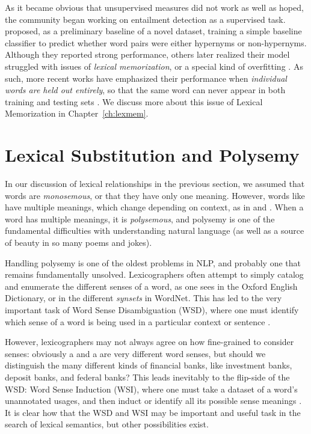 As it became obvious that unsupervised measures did not work as
well as hoped, the community began working on entailment detection as a
supervised task.  proposed, as a preliminary baseline
of a novel dataset, training a simple baseline classifier to predict whether
word pairs were either hypernyms or non-hypernyms. Although they reported strong performance,
others later realized their model struggled with issues of {\em lexical
memorization}, or a special kind of overfitting
\cite{roller:2014:coling,weeds:2014:coling,levy:2015:naacl}. As such, more
recent works have emphasized their performance when {\em individual words are
held out entirely}, so that the same word can never appear in both training and
testing sets
\cite{roller:2014:coling,kruszewski:2015:tacl,levy:2015:naacl,shwartz:2016:acl,roller:2016:naacl}.
We discuss more about this issue of Lexical Memorization in
Chapter~\ref{ch:lexmem}.

\section{Lexical Substitution and Polysemy}
\label{sec:lexsub}

In our discussion of lexical relationships in the previous section, we assumed
that words are {\em monosemous}, or that they have only one meaning. However,
words like  have multiple meanings, which change depending on
context, as in  and . When a word has
multiple meanings, it is {\em polysemous}, and polysemy is one of the
fundamental difficulties with understanding natural language (as well as a
source of beauty in so many poems and jokes).

Handling polysemy is one of the oldest problems in NLP, and probably one that
remains fundamentally unsolved. Lexicographers often attempt to simply
catalog and enumerate the different senses of a word, as one sees in the
Oxford English Dictionary, or in the different {\em synsets} in WordNet.
This has led to the very important task of Word Sense Disambiguation (WSD),
where one must identify which sense of a word is being used in a particular
context or sentence \cite{mccarthy:2009:llc,navigli:2009:csur}.

However, lexicographers may not always agree on how fine-grained to consider
senses: obviously a  and a  are very
different word senses, but should we distinguish the many different kinds of
financial banks, like investment banks, deposit banks, and federal banks?
This leads inevitably to the flip-side of the WSD: Word Sense Induction
(WSI), where one must take a dataset of a word's unannotated usages, and then
induct or identify all its possible sense meanings
\cite{mccarthy:2009:llc,navigli:2009:csur}.  It is clear how that the WSD and
WSI may be important and useful task in the search of lexical semantics, but
other possibilities exist.

